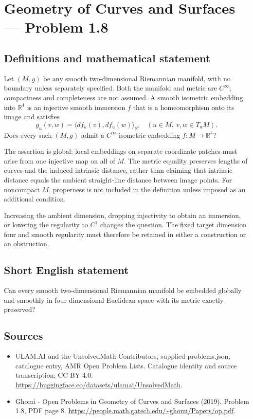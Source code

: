 \documentclass[11pt,a4paper]{article}
\begin{document}
\section*{Geometry of Curves and Surfaces — Problem 1.8}\label{statement}

\subsection{Definitions and mathematical statement}
Let $(M,g)$ be any smooth two-dimensional Riemannian manifold,
with no boundary unless separately specified. Both the manifold
and metric are $C^\infty$; compactness and completeness are not
assumed. A smooth isometric embedding into $\mathbb R^4$ is an
injective smooth immersion $f$ that is a homeomorphism onto its
image and satisfies
\[
           g_u(v,w)=\langle df_u(v),df_u(w)\rangle_{\mathbb R^4}
           \quad(u\in M,\ v,w\in T_uM).
\]
Does every such $(M,g)$ admit a $C^\infty$ isometric embedding
$f:M\to\mathbb R^4$?

The assertion is global: local embeddings on separate coordinate
patches must arise from one injective map on all of $M$. The
metric equality preserves lengths of curves and the induced
intrinsic distance, rather than claiming that intrinsic distance
equals the ambient straight-line distance between image points.
For noncompact $M$, properness is not included in the definition
unless imposed as an additional condition.

Increasing the ambient dimension, dropping injectivity to obtain
an immersion, or lowering the regularity to $C^1$ changes the
question. The fixed target dimension four and smooth regularity
must therefore be retained in either a construction or an
obstruction.
\subsection{Short English statement}
Can every smooth two-dimensional Riemannian manifold be embedded
globally and smoothly in four-dimensional Euclidean space with
its metric exactly preserved?
\subsection{Sources}
\begin{itemize}
\item[S1] ULAM.AI and the UnsolvedMath Contributors, supplied problems.json, catalogue entry, AMR Open Problem Lists. Catalogue identity and source transcription; CC BY 4.0.
\url{https://huggingface.co/datasets/ulamai/UnsolvedMath}.
\item[S2] Ghomi - Open Problems in Geometry of Curves and Surfaces (2019), Problem 1.8, PDF page 8. 
\url{https://people.math.gatech.edu/~ghomi/Papers/op.pdf}.
\end{itemize}
\end{document}

